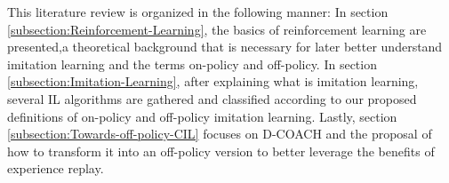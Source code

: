 \setlength{\parskip}{1em}

This literature review is organized in the following manner: In section \ref{subsection:Reinforcement-Learning}, the basics of reinforcement learning are presented,a theoretical background that is necessary for later better understand imitation learning and the terms on-policy and off-policy. In section \ref{subsection:Imitation-Learning}, after explaining what is imitation learning, several IL algorithms are gathered and classified according to our proposed definitions of on-policy and off-policy imitation learning. Lastly, section \ref{subsection:Towards-off-policy-CIL} focuses on D-COACH and the proposal of how to transform it into an off-policy version to better leverage the benefits of experience replay.



